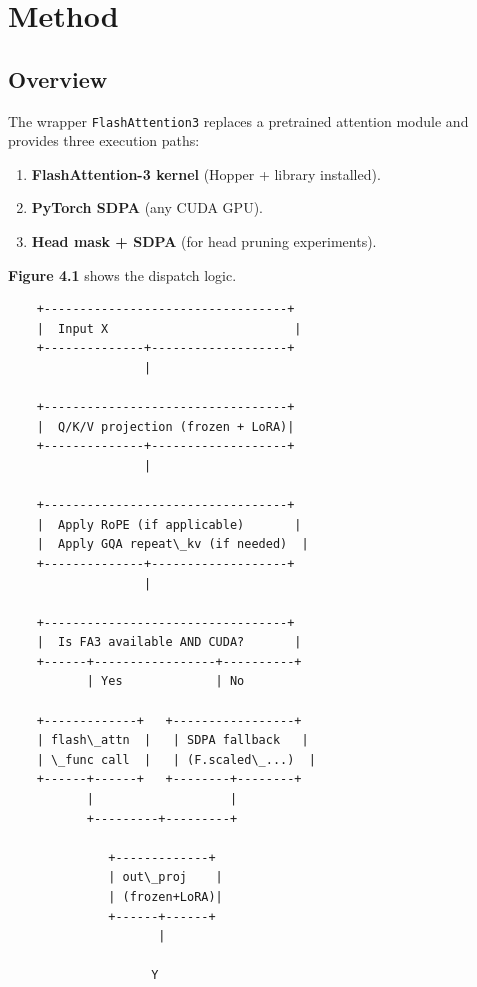 \section{Method}

\subsection{Overview}

The wrapper \texttt{FlashAttention3} replaces a pretrained attention module and 
provides three execution paths:

\begin{enumerate}
\item \textbf{FlashAttention-3 kernel} (Hopper + library installed).
\item \textbf{PyTorch SDPA} (any CUDA GPU).
\item \textbf{Head mask + SDPA} (for head pruning experiments).

\end{enumerate}
\textbf{Figure 4.1} shows the dispatch logic.

\begin{lstlisting}
    +----------------------------------+
    |  Input X                          |
    +--------------+-------------------+
                   |
                    
    +----------------------------------+
    |  Q/K/V projection (frozen + LoRA)|
    +--------------+-------------------+
                   |
                    
    +----------------------------------+
    |  Apply RoPE (if applicable)       |
    |  Apply GQA repeat\_kv (if needed)  |
    +--------------+-------------------+
                   |
                    
    +----------------------------------+
    |  Is FA3 available AND CUDA?       |
    +------+-----------------+----------+
           | Yes             | No
                              
    +-------------+   +-----------------+
    | flash\_attn  |   | SDPA fallback   |
    | \_func call  |   | (F.scaled\_...)  |
    +------+------+   +--------+--------+
           |                   |
           +---------+---------+
                      
              +-------------+
              | out\_proj    |
              | (frozen+LoRA)|
              +------+------+
                     |
                      
                    Y
\end{lstlisting}


